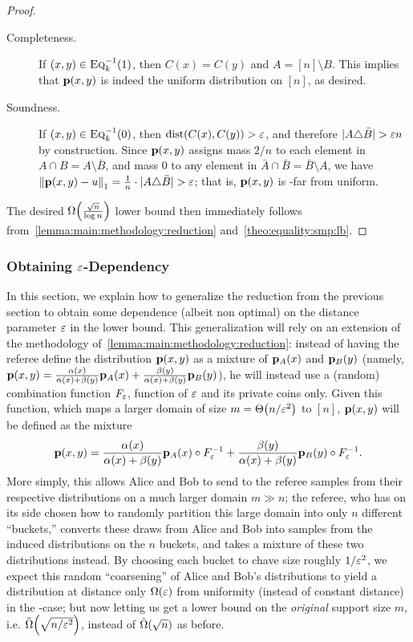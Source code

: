 \begin{proof}
\begin{description}
  \item[Completeness.] If $(x,y)\in \EQ[k]^{-1}(1)$, then $C(x)=C(y)$ and $A=[n]\setminus B$. This implies that $\p(x,y)$ is indeed the uniform distribution on $[n]$, as desired.
  \item[Soundness.] If $(x,y)\in \EQ[k]^{-1}(0)$, then $\dist{C(x)}{C(y)} > \eps$, and therefore $\dabs{A\triangle \bar{B}} > \eps n$ by construction. Since $\p(x,y)$ assigns mass $2/n$ to each element in $A\cap B=A\setminus \bar{B}$, and mass $0$ to any element in $\bar{A}\cap \bar{B}=\bar{B}\setminus A$, we have $\normone{\p(x,y) - u} = \frac{1}{n}\cdot\dabs{A\triangle \bar{B}} > \eps$; that is, $\p(x,y)$ is \eps-far from uniform.
\end{description}
The desired $\bigOmega{\frac{\sqrt{n}}{\log n}}$ lower bound then immediately follows from~\cref{lemma:main:methodology:reduction} and~\cref{theo:equality:smp:lb}.
\end{proof} 
\subsubsection{Obtaining $\eps$-Dependency}\label{sec:eps_dep}
In this section, we explain how to generalize the reduction from the previous section to obtain some dependence (albeit non optimal) on the distance parameter $\eps$ in the lower bound. This generalization will rely on an extension of the methodology of~\cref{lemma:main:methodology:reduction}: instead of having the referee define the distribution $\p(x,y)$ as a mixture of $\p_A(x)$ and $\p_B(y)$ (namely, $\p(x,y) = \frac{\alpha(x)}{\alpha(x)+\beta(y)}\p_A(x)+\frac{\beta(y)}{\alpha(x)+\beta(y)}\p_B(y)$), he will instead use a (random) combination function $F_\eps$, function of $\eps$ and its private coins only. Given this function, which maps a larger domain of size $m=\bigTheta{n/\eps^2}$ to $[n]$, $\p(x,y)$ will be defined as the mixture
\[
    \p(x,y) = \frac{\alpha(x)}{\alpha(x)+\beta(y)}\p_A(x) \circ F_\eps^{-1} +  \frac{\beta(y)}{\alpha(x)+\beta(y)} \p_B(y) \circ F_\eps^{-1}.
\]
More simply, this allows Alice and Bob to send to the referee samples from their respective distributions on a much larger domain $m \gg n$; the referee, who has on its side chosen how to randomly partition this large domain into only $n$ different ``buckets,'' converts these draws from Alice and Bob into samples from the induced distributions on the $n$ buckets, and takes a mixture of these two distributions instead. By choosing each bucket to chave size roughly $1/\eps^2$, we expect this random ``coarsening'' of Alice and Bob's distributions to yield a distribution at distance only $\Omega(\eps)$ from uniformity (instead of constant distance) in the \no-case; but now letting us get a lower bound on the \emph{original} support size $m$, i.e. $\tildeOmega{\sqrt{n/\eps^2}}$, instead of $\tildeOmega{\sqrt{n}}$ as before.

